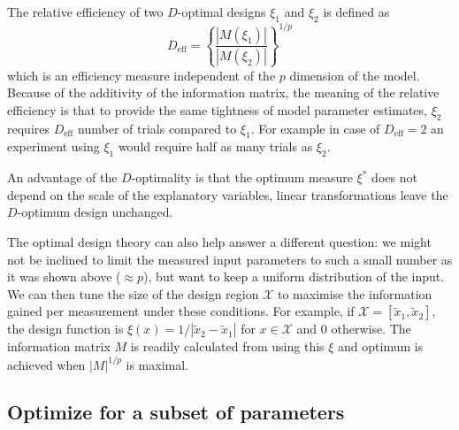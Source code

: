 \documentclass[12pt]{iopart}
\begin{document}
The relative efficiency of two $D$-optimal designs $\xi_1$ and $\xi_2$ is defined as
\begin{equation}
D_\mathrm{eff} = \left\{\frac{|M(\xi_1)|}{|M(\xi_2)|}\right\}^{1/p}
\end{equation}
which is an efficiency measure independent of the $p$ dimension of the model. Because of the additivity of the information matrix, the meaning of the relative efficiency is that to provide the same tightness of model parameter estimates, $\xi_2$ requires $D_\mathrm{eff}$ number of trials compared to $\xi_1$. For example in case of $D_\mathrm{eff} = 2$ an experiment using $\xi_1$ would require half as many trials as $\xi_2$.

An advantage of the $D$-optimality is that the optimum measure $\xi^*$ does not depend on the scale of the explanatory variables, linear transformations leave the $D$-optimum design unchanged.

The optimal design theory can also help answer a different question: we might not be inclined to limit the measured input parameters to such a small number as it was shown above ($\approx p$), but want to keep a uniform distribution of the input. We can then tune the size of the design region $\mathcal{X}$ to maximise the information gained per measurement under these conditions. For example, if $\mathcal{X} = [\tilde x_1, \tilde x_2]$, the design function is $\xi(x) = 1/{|\tilde x_2 - \tilde x_1|}$ for $x \in \mathcal{X}$ and $0$ otherwise. The information matrix $M$ is readily calculated from  using this $\xi$ and optimum is achieved when $|M|^{1/p}$ is maximal.

\subsection{Optimize for a subset of parameters}
\end{document}
